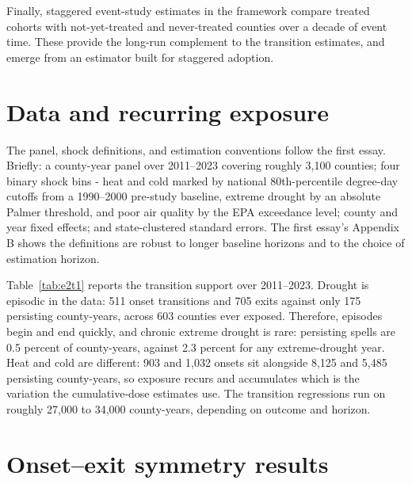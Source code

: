 \documentclass[a4paper,11pt]{report}
\begin{document}
Finally, staggered event-study estimates in the \citet{callaway2021did} framework compare treated cohorts with not-yet-treated and never-treated counties over a decade of event time. These provide the long-run complement to the transition estimates, and emerge from an estimator built for staggered adoption.

\FloatBarrier
\section{Data and recurring exposure}

The panel, shock definitions, and estimation conventions follow the first essay. Briefly: a county-year panel over 2011--2023 covering roughly 3,100 counties; four binary shock bins - heat and cold marked by national 80th-percentile degree-day cutoffs from a 1990--2000 pre-study baseline, extreme drought by an absolute Palmer threshold, and poor air quality by the EPA exceedance level; county and year fixed effects; and state-clustered standard errors. The first essay's Appendix B shows the definitions are robust to longer baseline horizons and to the choice of estimation horizon.

Table~\ref{tab:e2t1} reports the transition support over 2011--2023. Drought is episodic in the data: 511 onset transitions and 705 exits against only 175 persisting county-years, across 603 counties ever exposed. Therefore, episodes begin and end quickly, and chronic extreme drought is rare: persisting spells are 0.5 percent of county-years, against 2.3 percent for any extreme-drought year. Heat and cold are different: 903 and 1,032 onsets sit alongside 8,125 and 5,485 persisting county-years, so exposure recurs and accumulates which is the variation the cumulative-dose estimates use. The transition regressions run on roughly 27,000 to 34,000 county-years, depending on outcome and horizon.



\FloatBarrier
\section{Onset--exit symmetry results}
\end{document}
